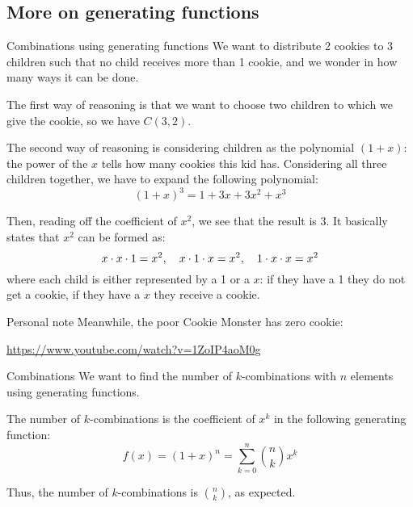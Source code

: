 \documentclass[a4paper]{article}
\begin{document}
\subsection{More on generating functions}
\begin{parag}{Combinations using generating functions}
    We want to distribute 2 cookies to 3 children such that no child receives more than 1 cookie, and we wonder in how many ways it can be done.

    The first way of reasoning is that we want to choose two children to which we give the cookie, so we have $C\left(3, 2\right)$.

    The second way of reasoning is considering children as the polynomial $\left(1 + x\right)$: the power of the $x$ tells how many cookies this kid has. Considering all three children together, we have to expand the following polynomial:
    \[\left(1 + x\right)^3 = 1 + 3x + 3x^2 + x^3\]

    Then, reading off the coefficient of $x^2$, we see that the result is $3$. It basically states that $x^2$ can be formed as:
    \[x\cdot x\cdot 1 = x^2, \quad x\cdot 1\cdot x = x^2, \quad 1\cdot x\cdot x = x^2\]
    where each child is either represented by a 1 or a $x$: if they have a 1 they do not get a cookie, if they have a $x$ they receive a cookie.

    \begin{subparag}{Personal note}
        Meanwhile, the poor Cookie Monster has zero cookie:
        \begin{center}
        \url{https://www.youtube.com/watch?v=1ZoIP4aoM0g}
        \end{center}
    \end{subparag}
\end{parag}

\begin{parag}{Combinations}
    We want to find the number of $k$-combinations with $n$ elements using generating functions.

    The number of $k$-combinations is the coefficient of $x^k$ in the following generating function:
    \[f\left(x\right) = \left(1 + x\right)^n = \sum_{k=0}^{n} \binom{n}{k} x^k\]

    Thus, the number of $k$-combinations is $\binom{n}{k}$, as expected.
\end{parag}
\end{document}

